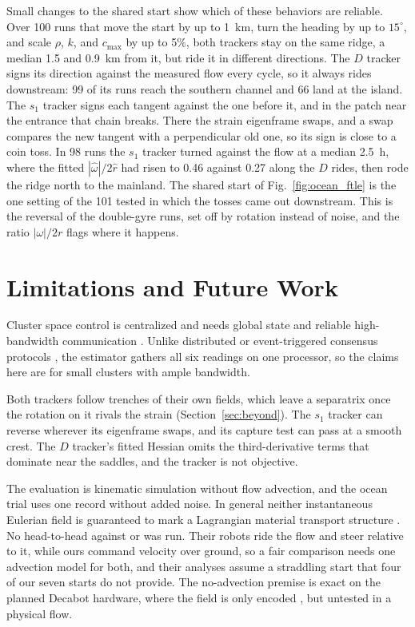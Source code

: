 \documentclass[lettersize,journal]{IEEEtran}
\newcommand{\rev}[1]{#1}
\begin{document}
Small changes to the shared start show which of these behaviors are
reliable. Over 100 runs that move the start by up to 1~km, turn the
heading by up to $15^\circ$, and scale $\rho$, $k$, and $c_{\max}$ by up
to 5\%, both trackers stay on the same ridge, a median \rev{1.5} and
\rev{0.9}~km from it, but ride it in different directions. The $D$
tracker signs its direction against the measured flow every cycle, so it
always rides downstream: \rev{99} of its runs reach the southern channel
and \rev{66} land at the island. The $s_1$ tracker signs each tangent
against the one before it, and in the patch near the entrance that chain
breaks. There the strain eigenframe swaps, and a swap compares the new
tangent with a perpendicular old one, so its sign is close to a coin toss.
In \rev{98} runs the $s_1$ tracker turned against the flow at a median
\rev{2.5}~h, where the fitted $|\hat{\omega}|/2\hat{r}$ had risen to
\rev{0.46} against \rev{0.27} along the $D$ rides, then rode the ridge
north to the mainland. The shared start of Fig.~\ref{fig:ocean_ftle} is
the one setting of the \rev{101} tested in which the tosses came out
downstream. This is the reversal of the double-gyre runs, set off by
rotation instead of noise, and the ratio $|\omega|/2r$ flags where it
happens.

\section{Limitations and Future Work}
\label{sec:disc_limits}

Cluster space control is centralized and needs global state and reliable
high-bandwidth communication \cite{30}. Unlike distributed or
event-triggered consensus protocols \cite{37}, the estimator gathers all six
readings on one processor, so the claims here are for small clusters with
ample bandwidth.

Both trackers follow trenches of their own fields, which leave a
separatrix once the rotation on it rivals the strain
(Section~\ref{sec:beyond}). The $s_1$ tracker can reverse wherever its
eigenframe swaps, and its capture test can pass at a smooth crest. The
$D$ tracker's fitted Hessian omits the third-derivative terms that
dominate near the saddles, and the tracker is not objective.

The evaluation is kinematic simulation without flow advection, and the
ocean trial uses one record without added noise. In general neither
instantaneous Eulerian field is guaranteed to mark a Lagrangian material
transport structure \cite{19}. No head-to-head against \cite{26,27,28} or
\cite{29} was run. Their robots ride the flow and steer relative to it,
while ours command velocity over ground, so a fair comparison needs one
advection model for both, and their analyses assume a straddling start
that four of our seven starts do not provide. The no-advection premise is
exact on the planned Decabot hardware, where the field is only encoded
\cite{32}, but untested in a physical flow.
\end{document}
